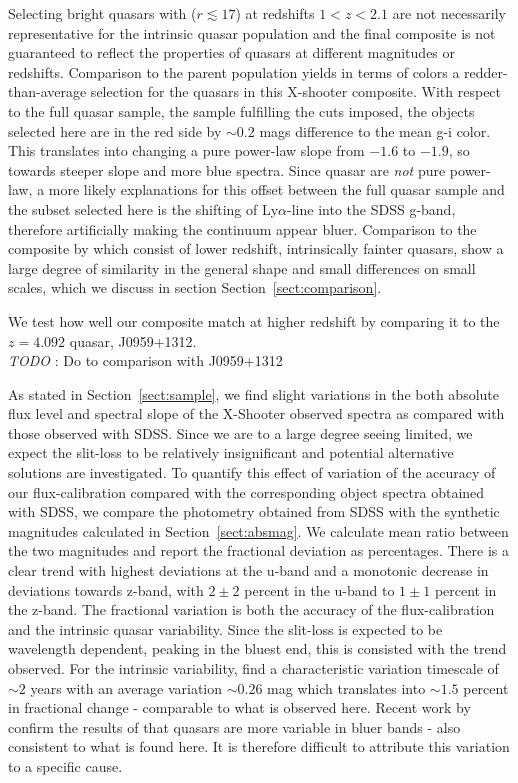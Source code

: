\documentclass{aa}    %
\newcommand{\sectionname}{Section}
\newcommand{\Sect}[1]{\sectionname~\ref{sect:#1}}
\newcommand{\sect}[1]{\Sect{#1}}
\newcommand{\lya}{Ly$\alpha$}
\newcommand{\todo}[3]{{\color{#2}\emph{#1}: #3}}
\newcommand{\jstodo}[1]{\todo{ \\TODO }{green}{#1}}
\begin{document}
Selecting bright quasars with ($r \lesssim 17$) at redshifts $1 < z < 2.1$ are not necessarily representative for the intrinsic quasar population \citep{Paris2014} and the final composite is not guaranteed to reflect the properties of quasars at different magnitudes or redshifts. Comparison to the parent population yields in terms of colors a redder-than-average selection for the quasars in this X-shooter composite. With respect to the full quasar sample, the sample fulfilling the cuts imposed, the objects selected here are in the red side by $\sim 0.2$ mags difference to the mean g-i color. This translates into changing a pure power-law slope from $-1.6$ to $-1.9$, so towards steeper slope and more blue spectra. Since quasar are \textit{not} pure power-law, a more likely explanations for this offset between the full quasar sample and the subset selected here is the shifting of \lya-line into the SDSS g-band, therefore artificially making the continuum appear bluer.
Comparison to the composite by \citep{VandenBerk2001} which consist of lower redshift, intrinsically fainter quasars, show a large degree of similarity in the general shape and small differences on small scales, which we discuss in section \sect{comparison}. 


We test how well our composite match at higher redshift by comparing it to the $z=4.092$ quasar, J0959+1312.
\jstodo{Do to comparison with J0959+1312}





As stated in \sect{sample}, we find slight variations in the both absolute flux level and spectral slope of the X-Shooter observed spectra as compared with those observed with SDSS. Since we are to a large degree seeing limited, we expect the slit-loss to be relatively insignificant and potential alternative solutions are investigated. To quantify this effect of variation of the accuracy of our flux-calibration compared with the corresponding object spectra obtained with SDSS, we compare the photometry obtained from SDSS with the synthetic magnitudes calculated in \sect{absmag}. We calculate mean ratio between the two magnitudes and report the fractional deviation as percentages. There is a clear trend with highest deviations at the u-band and a monotonic decrease in deviations towards z-band, with $2 \pm 2$ percent in the u-band to $1 \pm 1$ percent in the z-band. The fractional variation is both the accuracy of the flux-calibration and the intrinsic quasar variability. Since the slit-loss is expected to be wavelength dependent, peaking in the bluest end, this is consisted with the trend observed. For the intrinsic variability, \cite{MacLeod2012} find a characteristic variation timescale of $\sim 2$ years with an average variation $\sim 0.26$ mag which translates into $\sim 1.5$ percent in fractional change - comparable to what is observed here. Recent work by \cite{Morganson2014} confirm the results of \cite{Helfand2001} that quasars are more variable in bluer bands - also consistent to what is found here. It is therefore difficult to attribute this variation to a specific cause. 
\end{document}
